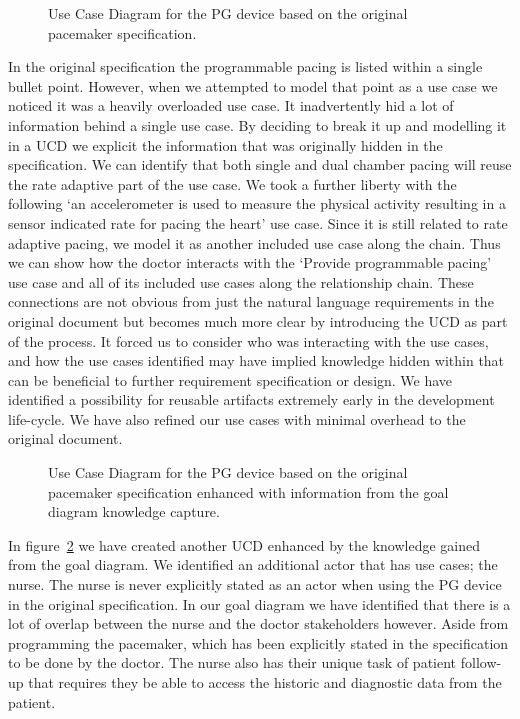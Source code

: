 \begin{figure}
	\centering
	
	\caption{Use Case Diagram for the PG device based on the original pacemaker specification.}
	\label{fig:pg_device_UCD_original_spec}
\end{figure}

In the original specification the programmable pacing is listed within a single bullet point. However, when we attempted to model that point as a use case we noticed it was a heavily overloaded use case. It inadvertently hid a lot of information behind a single use case. By deciding to break it up and modelling it in a UCD we explicit the information that was originally hidden in the specification. We can identify that both single and dual chamber pacing will reuse the rate adaptive part of the use case. We took a further liberty with the following `an accelerometer is used to measure the physical activity resulting in a sensor indicated rate for pacing the heart' use case. Since it is still related to rate adaptive pacing, we model it as another included use case along the chain. Thus we can show how the doctor interacts with the `Provide programmable pacing' use case and all of its included use cases along the relationship chain. These connections are not obvious from just the natural language requirements in the original document but becomes much more clear by introducing the UCD as part of the process. It forced us to consider who was interacting with the use cases, and how the use cases identified may have implied knowledge hidden within that can be beneficial to further requirement specification or design. We have identified a possibility for reusable artifacts extremely early in the development life-cycle. We have also refined our use cases with minimal overhead to the original document.

\begin{figure}
	\centering
	
	\caption{Use Case Diagram for the PG device based on the original pacemaker specification enhanced with information from the goal diagram knowledge capture.}
	\label{fig:pg_device_UCD}
\end{figure}

In figure~\ref{fig:pg_device_UCD} we have created another UCD enhanced by the knowledge gained from the goal diagram. We identified an additional actor that has use cases; the nurse. The nurse is never explicitly stated as an actor when using the PG device in the original specification. In our goal diagram we have identified that there is a lot of overlap between the nurse and the doctor stakeholders however. Aside from programming the pacemaker, which has been explicitly stated in the specification to be done by the doctor. The nurse also has their unique task of patient follow-up that requires they be able to access the historic and diagnostic data from the patient. 

